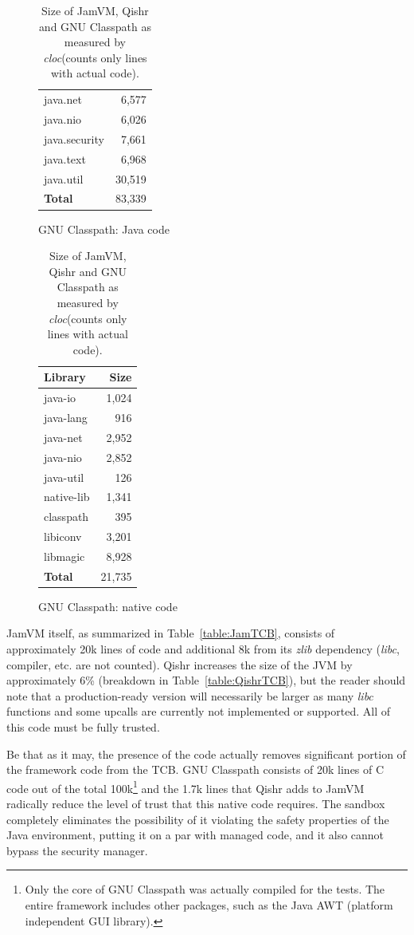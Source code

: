 \documentclass[a4paper,12pt,twoside,openright]{report}
\newcommand{\tool}[1]{\emph{#1}}
\newcommand{\lib}[1]{\tool{lib#1}}
\begin{document}
\begin{table}[h]
\begin{subfigure}{0.45\textwidth}
\begin{tabular}{|l|r|}
		java.net		& 6,577		\\ %
		java.nio		& 6,026		\\ %
		java.security	& 7,661		\\ %
		java.text		& 6,968		\\ %
		java.util		& 30,519		\\ %
		\hline
		\bf Total		& 83,339		\\
		\hline
		\end{tabular}
		\caption{GNU Classpath: Java code}
	\end{subfigure}
	\begin{subfigure}{0.45\textwidth}
		\centering
		\footnotesize
		\begin{tabular}{|l|r|}
		\hline
		\bf Library		& \bf Size		\\
		\hline
		java-io		& 1,024				\\
		java-lang		& 916				\\
		java-net		& 2,952				\\
		java-nio		& 2,852				\\
		java-util		& 126				\\
		native-lib		& 1,341				\\
		classpath		& 395				\\
		libiconv		& 3,201				\\
		libmagic		& 8,928				\\
		\hline
		\bf Total		& 21,735				\\
		\hline
		\end{tabular}
		\caption{GNU Classpath: native code}
	\end{subfigure}
	\caption{Size of JamVM, Qishr and GNU Classpath as measured by \emph{cloc}\protect\footnotemark (counts only lines with actual code).}
\end{table}

JamVM itself, as summarized in Table~\ref{table:JamTCB}, consists of approximately 20k lines of code and additional 8k from its \emph{zlib} dependency (\lib{c}, compiler, etc. are not counted). Qishr increases the size of the JVM by approximately 6\% (breakdown in Table~\ref{table:QishrTCB}), but the reader should note that a production-ready version will necessarily be larger as many \lib{c} functions and some upcalls are currently not implemented or supported. All of this code must be fully trusted.

Be that as it may, the presence of the code actually removes significant portion of the framework code from the TCB.  GNU Classpath consists of 20k lines of C code out of the total 100k\footnote{Only the core of GNU Classpath was actually compiled for the tests. The entire framework includes other packages, such as the Java AWT (platform independent GUI library).} and the 1.7k lines that Qishr adds to JamVM radically reduce the level of trust that this native code requires. The sandbox completely eliminates the possibility of it violating the safety properties of the Java environment, putting it on a par with managed code, and it also cannot bypass the security manager.
\end{document}
